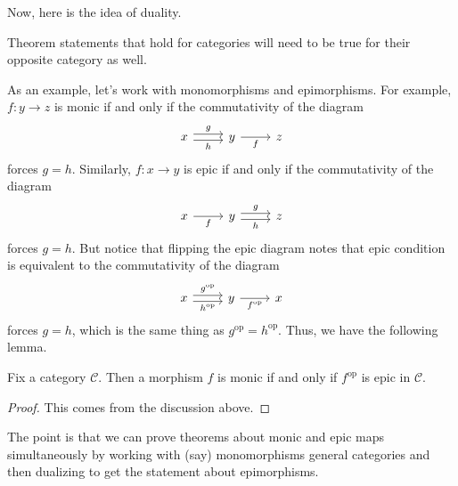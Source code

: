 Now, here is the idea of duality.
\begin{idea}
	Theorem statements that hold for categories will need to be true for their opposite category as well.
\end{idea}
As an example, let's work with monomorphisms and epimorphisms. For example, $f:y\to z$ is monic if and only if the commutativity of the diagram
\[\begin{tikzcd}
	x & y & z
	\arrow["g", shift left=1, from=1-1, to=1-2]
	\arrow["h"', shift right=1, from=1-1, to=1-2]
	\arrow["f"', from=1-2, to=1-3]
\end{tikzcd}\]
forces $g=h$. Similarly, $f:x\to y$ is epic if and only if the commutativity of the diagram
\[\begin{tikzcd}
	x & y & z
	\arrow["g", shift left=1, from=1-2, to=1-3]
	\arrow["h"', shift right=1, from=1-2, to=1-3]
	\arrow["f"', from=1-1, to=1-2]
\end{tikzcd}\]
forces $g=h$. But notice that flipping the epic diagram notes that epic condition is equivalent to the commutativity of the diagram
\[\begin{tikzcd}
	x & y & x
	\arrow["{g^\mathrm{op}}", shift left=1, from=1-1, to=1-2]
	\arrow["{h^\mathrm{op}}"', shift right=1, from=1-1, to=1-2]
	\arrow["{f^\mathrm{op}}"', from=1-2, to=1-3]
\end{tikzcd}\]
forces $g=h$, which is the same thing as $g^\mathrm{op}=h^\mathrm{op}$. Thus, we have the following lemma.
\begin{lemma}
	Fix a category $\mathcal C$. Then a morphism $f$ is monic if and only if $f^\mathrm{op}$ is epic in $\mathcal C$.
\end{lemma}
\begin{proof}
	This comes from the discussion above.
\end{proof}
The point is that we can prove theorems about monic and epic maps simultaneously by working with (say) monomorphisms general categories and then dualizing to get the statement about epimorphisms.

